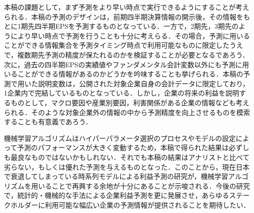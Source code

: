 \documentclass[a4paper，12pt]{jsarticle}
\begin{document}
本稿の課題として，まず予測をより早い時点で実行できるようにすることが考えられる．本稿の予測のデザインは，前期四半期決算情報の開示後，その情報をもとに1期先四半期EPSを予測するものとなっている．一方で，2期先，3期先のようにより早い時点で予測を行うことも十分に考えらる．その場合，予測に用いることができる情報集合を予測タイミング時点で利用可能なものに限定したうえで，複数期先予測の精度が保たれるのかを検証することが必要となるであろう．次に，過去の四半期EPSの実績値やファンダメンタル会計変数以外にも予測に用いることができる情報があるのかどうかを吟味することも挙げられる．本稿の予測で用いた説明変数は，公開された対象企業自身の会計データに限定しており，1企業内で完結しているものとなっている．しかし，企業の将来の利益を説明するものとして，マクロ要因や産業別要因，利害関係がある企業の情報なども考えられる．そのような対象企業外の情報の中から予測精度を向上させるものを模索することも有意義であろう．

機械学習アルゴリズムはハイパーパラメータ選択のプロセスやモデルの設定によって予測のパフォーマンスが大きく変動するため，本稿で得られた結果は必ずしも最良なものではないかもしれない．それでも本稿の結果はアナリストと比べて劣らない，もしくは優れた予測を与えるものとなった．このことから，現在日本で衰退してしまっている時系列モデルによる利益予測の研究が，機械学習アルゴリズムを用いることで再興する余地が十分にあることが示唆される．今後の研究で，統計的・機械的な手法による企業利益予測を更に発展させ，あらゆるステークホルダーに利用可能な幅広い企業の予測情報が提供されることを期待したい．






% 

% 


\appendix 

\end{document}
